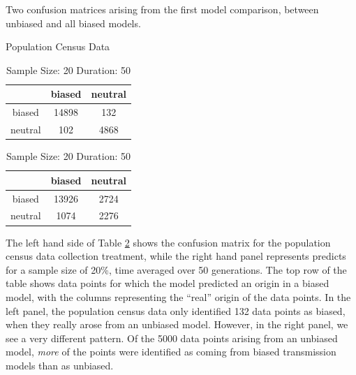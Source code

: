 \begin{table}[!htb]
    \caption{Two confusion matrices arising from the first model comparison, between unbiased and all biased models.}
    \label{tab:confusion-matrix-comparison}	
    \begin{subtable}{.5\linewidth}
      \centering
        \caption{Population Census Data}
\begin{tabular}{|c|c|c|}
  \hline
 & biased & neutral \\ 
  \hline
biased & 14898 & 132 \\ 
  neutral & 102 & 4868 \\ 
   \hline
\end{tabular}
    \end{subtable}%
    \begin{subtable}{.5\linewidth}
      \centering
        \caption{Sample Size: 20  Duration:  50}
\begin{tabular}{|c|c|c|}
  \hline
 & biased & neutral \\ 
  \hline
biased & 13926 & 2724 \\ 
  neutral & 1074 & 2276 \\ 
   \hline
\end{tabular}
    \end{subtable} 
\end{table}

The left hand side of Table \ref{tab:confusion-matrix-comparison} shows the confusion matrix for the population census data collection treatment, while the right hand panel represents predicts for a sample size of 20\%, time averaged over 50 generations.  The top row of the table shows data points for which the model predicted an origin in a biased model, with the columns representing the ``real'' origin of the data points.  In the left panel, the population census data only identified 132 data points as biased, when they really arose from an unbiased model.  However, in the right panel, we see a very different pattern.  Of the 5000 data points arising from an unbiased model, \emph{more} of the points were identified as coming from biased transmission models than as unbiased.  

